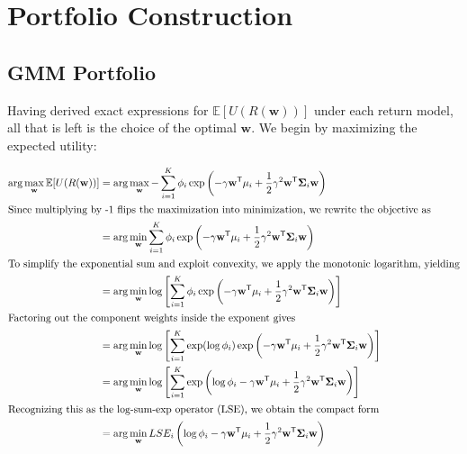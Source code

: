 \section{Portfolio Construction}
\subsection{GMM Portfolio}
Having derived exact expressions for $\mathbb{E}[U(R(\mathbf w))]$ under each return model, all that is left is the choice of the optimal $\mathbf w$. We begin by maximizing the expected utility:

\begin{align*}
\arg\max_\mathbf{w}{\mathbb{E}[U(R(\mathbf{w}))]} &= \arg\max_\mathbf{w}{-\sum_{i=1}^{K}\phi_{i}\exp\left(-\gamma\mathbf{w}^{\mathsf{T}}\mathbf{\mu}_i+\frac{1}{2}\gamma^2\mathbf{w}^{\mathsf{T}}\mathbf{\Sigma}_i\mathbf{w}\right)} \\
\intertext{Since multiplying by -1 flips the maximization into minimization, we rewrite the objective as}
&= \arg\min_\mathbf{w}{\sum_{i=1}^{K}\phi_{i}\exp\left(-\gamma\mathbf{w}^{\mathsf{T}}\mathbf{\mu}_i+\frac{1}{2}\gamma^2\mathbf{w}^{\mathsf{T}}\mathbf{\Sigma}_i\mathbf{w}\right)} \\
\intertext{To simplify the exponential sum and exploit convexity, we apply the monotonic logarithm, yielding}
&= \arg\min_\mathbf{w}\log{\left[{\sum_{i=1}^{K}\phi_{i}\exp\left(-\gamma\mathbf{w}^{\mathsf{T}}\mathbf{\mu}_i+\frac{1}{2}\gamma^2\mathbf{w}^{\mathsf{T}}\mathbf{\Sigma}_i\mathbf{w}\right)}\right]} \\
\intertext{Factoring out the component weights inside the exponent gives}
&= \arg\min_\mathbf{w}\log{\left[{\sum_{i=1}^{K}\exp({\log{\phi_{i}}})\exp\left(-\gamma\mathbf{w}^{\mathsf{T}}\mathbf{\mu}_i+\frac{1}{2}\gamma^2\mathbf{w}^{\mathsf{T}}\mathbf{\Sigma}_i\mathbf{w}\right)}\right]} \\
&= \arg\min_\mathbf{w}\log{\left[{\sum_{i=1}^{K}\exp\left(\log{\phi_{i}}-\gamma\mathbf{w}^{\mathsf{T}}\mathbf{\mu}_i+\frac{1}{2}\gamma^2\mathbf{w}^{\mathsf{T}}\mathbf{\Sigma}_i\mathbf{w}\right)}\right]} \\
\intertext{Recognizing this as the log-sum-exp operator (LSE), we obtain the compact form}
&= \arg\min_\mathbf{w}LSE_i\left(\log{\phi_{i}}-\gamma\mathbf{w}^{\mathsf{T}}\mathbf{\mu}_i+\frac{1}{2}\gamma^2\mathbf{w}^{\mathsf{T}}\mathbf{\Sigma}_i\mathbf{w}\right)
\end{align*}



